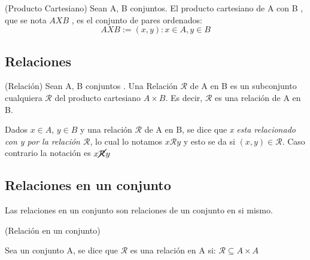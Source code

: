 \documentclass[10pt]{article}
\begin{document}
\begin{defi}(Producto Cartesiano)
Sean A, B conjuntos. El producto cartesiano de A con B , que se nota
$A X B$ , es el conjunto de pares ordenados:
$$A X B := {(x,y) : x \in A, y \in B}$$
\end{defi}

\newpage

\begin{center}
 \section{Relaciones}
\end{center}

\begin{defi}(Relación)
	Sean A, B conjuntos . Una Relación $\mathcal{R}$ de A en B  es un subconjunto  cualquiera $\mathcal{R}$
del producto cartesiano $A \times B$. Es decir, $\mathcal{R}$ es una relación  de A en B.
\end{defi}

Dados $x \in A$, $y \in B$ y una relación $\mathcal{R}$ de A en B, se dice que \textit{x esta relacionado con y por la relación $\mathcal{R}$}, lo cual lo notamos $x \mathcal{R} y$ y esto se da si $(x,y) \in \mathcal{R}$. Caso contrario la notación es $x \cancel{\mathcal{R}} y$

\begin{center}
\subsection{Relaciones en un conjunto} 
\end{center}

Las relaciones en un conjunto son relaciones de un conjunto en si mismo. 

\begin{defi}(Relación en un conjunto)

	Sea un conjunto A, se dice que $\mathcal{R}$ es una relación en A si: $\mathcal{R} \subseteq A \times A$
\end{defi}	
\end{document}
